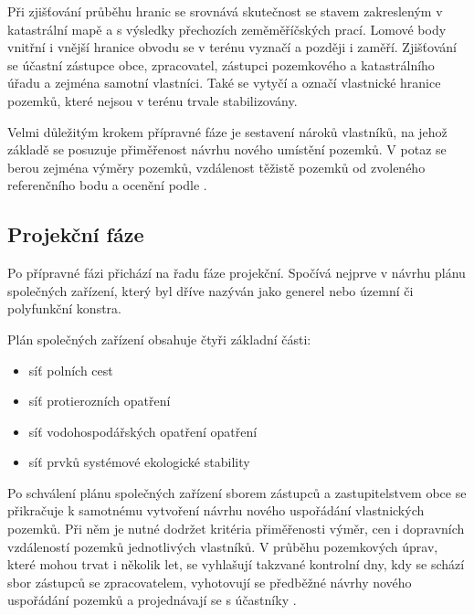 Při zjišťování průběhu hranic se srovnává skutečnost se stavem zakresleným v katastrální mapě a s výsledky přechozích zeměměříčských prací. Lomové body vnitřní i vnější hranice obvodu se v terénu vyznačí a později i zaměří. Zjišťování se účastní zástupce obce, zpracovatel, zástupci pozemkového a katastrálního úřadu a zejména samotní vlastníci. Také se vytyčí a označí vlastnické hranice pozemků, které nejsou v terénu trvale stabilizovány.

Velmi důležitým krokem přípravné fáze je sestavení nároků vlastníků, na jehož základě se posuzuje přiměřenost návrhu nového umístění pozemků. V potaz se berou zejména výměry pozemků, vzdálenost těžistě pozemků od zvoleného referenčního bodu a ocenění podle .

\subsection{Projekční fáze}
\label{projekcni_faze}

Po přípravné fázi přichází na řadu fáze projekční. Spočívá nejprve v návrhu plánu společných zařízení, který byl dříve nazýván jako generel nebo územní či polyfunkční konstra.

Plán společných zařízení obsahuje čtyři základní části:
	\begin{itemize}[leftmargin=1.5cm]
		\item síť polních cest
		\item síť protierozních opatření
		\item síť vodohospodářských opatření opatření
		\item síť prvků systémové ekologické stability
	\end{itemize}

Po schválení plánu společných zařízení sborem zástupců a zastupitelstvem obce se přikračuje k samotnému vytvoření návrhu nového uspořádání vlastnických pozemků. Při něm je nutné dodržet kritéria přiměřenosti výměr, cen i dopravních vzdáleností pozemků jednotlivých vlastníků. V průběhu pozemkových úprav, které mohou trvat i několik let, se vyhlašují takzvané kontrolní dny, kdy se schází sbor zástupců se zpracovatelem, vyhotovují se předběžné návrhy nového uspořádání pozemků a projednávají se s účastníky .

